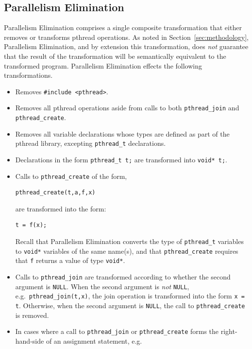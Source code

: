 \subsection{Parallelism Elimination}
\label{sec:refac:elimination}

Parallelism Elimination comprises a single composite transformation that either removes or transforms pthread operations. As noted in Section~\ref{sec:methodology}, Parallelism Elimination, and by extension this transformation, does \emph{not} guarantee that the result of the transformation will be semantically equivalent to the transformed program. Parallelism Elimination effects the following transformations.
%
\begin{itemize}
\item Removes \lstinline|#include <pthread>|.
\item Removes all pthread operations aside from calls to both \lstinline|pthread_join| and \lstinline|pthread_create|.
\item Removes all variable declarations whose types are defined as part of the pthread library, excepting \lstinline|pthread_t| declarations.
\item Declarations in the form \lstinline|pthread_t t;| are transformed into \lstinline|void* t;|.
\item Calls to \lstinline|pthread_create| of the form,
%
\begin{lstlisting}
pthread_create(t,a,f,x)
\end{lstlisting}
%
are transformed into the form:
%
\begin{lstlisting}
t = f(x);
\end{lstlisting}
%
\noindent
Recall that Parallelism Elimination converts the type of \lstinline|pthread_t| variables to \lstinline|void*| variables of the same name(s), and that \lstinline|pthread_create| requires that \lstinline|f| returns a value of type \lstinline|void*|.
%
\item Calls to \lstinline|pthread_join| are transformed according to whether the second argument is \lstinline|NULL|. When the second argument is \emph{not} \lstinline|NULL|, e.g.\ \lstinline|pthread_join(t,x)|, the join operation is transformed into the form \lstinline|x = t|. Otherwise, when the second argument is \lstinline|NULL|, the call to \lstinline|pthread_create| is removed.
%  
\item In cases where a call to \lstinline|pthread_join| or \lstinline|pthread_create| forms the right-hand-side of an assignment statement, e.g.

\end{itemize}
